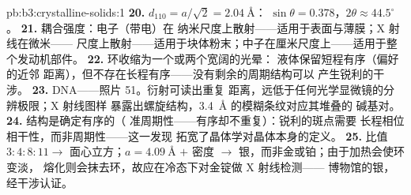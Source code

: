 \begin{solution}{pb:b3:crystalline-solids:1}
\textbf{20.} $d_{110} = a/\sqrt2 = \qty{2.04}{\angstrom}$：
$\sin\theta = 0.378$，$2\theta \approx 44.5^\circ$。
\textbf{21.} 耦合强度：电子（带电）在
纳米尺度上散射——适用于表面与薄膜；X 射线在微米——
尺度上散射——适用于块体粉末；中子在厘米尺度上——适用于整个发动机部件。
\textbf{22.} 环收缩为一个或两个宽阔的光晕：
液体保留短程有序（偏好的近邻
距离），但不存在长程有序——没有剩余的周期结构可以
产生锐利的干涉。
\textbf{23.} DNA——照片 51。衍射可读出重复
距离，远低于任何光学显微镜的分辨极限；X 射线图样
暴露出螺旋结构，\qty{3.4}{\angstrom} 的模糊条纹对应其堆叠的
碱基对。
\textbf{24.} 结构是确定有序的（
准周期性——有序却不重复）：锐利的斑点需要
长程相位相干性，而非周期性——这一发现
拓宽了晶体学对晶体本身的定义。
\textbf{25.} 比值 $3:4:8:11 \to$ 面心立方；$a = \qty{4.09}{\angstrom}$
$+$ 密度 $\to$ 银，而非金或铂；由于加热会使环变淡，
熔化则会抹去环，故应在冷态下对金锭做 X 射线检测——
博物馆的银，经干涉认证。
\end{solution}
